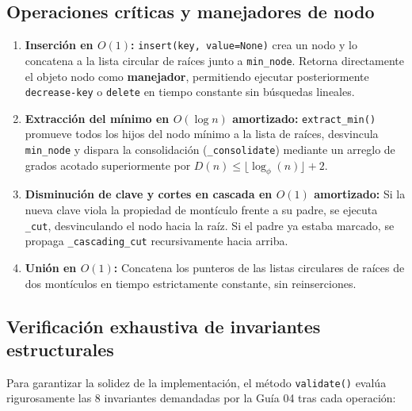 \subsection{Operaciones críticas y manejadores de nodo}
\begin{enumerate}
    \item \textbf{Inserción en $O(1)$:} \texttt{insert(key, value=None)} crea un nodo y lo concatena a la lista circular de raíces junto a \texttt{min\_node}. Retorna directamente el objeto nodo como \textbf{manejador}, permitiendo ejecutar posteriormente \texttt{decrease-key} o \texttt{delete} en tiempo constante sin búsquedas lineales.
    \item \textbf{Extracción del mínimo en $O(\log n)$ amortizado:} \texttt{extract\_min()} promueve todos los hijos del nodo mínimo a la lista de raíces, desvincula \texttt{min\_node} y dispara la consolidación (\texttt{\_consolidate}) mediante un arreglo de grados acotado superiormente por $D(n) \le \lfloor \log_\phi(n) \rfloor + 2$.
    \item \textbf{Disminución de clave y cortes en cascada en $O(1)$ amortizado:} Si la nueva clave viola la propiedad de montículo frente a su padre, se ejecuta \texttt{\_cut}, desvinculando el nodo hacia la raíz. Si el padre ya estaba marcado, se propaga \texttt{\_cascading\_cut} recursivamente hacia arriba.
    \item \textbf{Unión en $O(1)$:} Concatena los punteros de las listas circulares de raíces de dos montículos en tiempo estrictamente constante, sin reinserciones.
\end{enumerate}

\subsection{Verificación exhaustiva de invariantes estructurales}
Para garantizar la solidez de la implementación, el método \texttt{validate()} evalúa rigurosamente las 8 invariantes demandadas por la Guía 04 tras cada operación:

